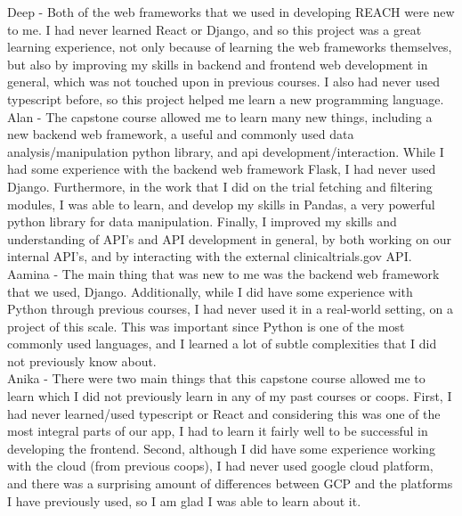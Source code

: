 \documentclass{article}
\begin{document}
    Deep - Both of the web frameworks that we used in developing REACH were new to me. I had never learned React or Django, and so this project
    was a great learning experience, not only because of learning the web frameworks themselves, but also by improving my skills in 
    backend and frontend web development in general, which was not touched upon in previous courses. I also had never used typescript before, so this project helped me learn a new programming language.\\

    Alan - The capstone course allowed me to learn many new things, including a new backend web framework, a useful and commonly used data analysis/manipulation python library, and api development/interaction. While 
    I had some experience with the backend web framework Flask, I had never used Django. Furthermore, in the work that I did on the trial fetching and filtering modules, I was able to learn, and develop 
    my skills in Pandas, a very powerful python library for data manipulation. Finally, I improved my skills and understanding of API's and API development in general, by both working on our internal 
    API's, and by interacting with the external clinicaltrials.gov API.\\

    Aamina - The main thing that was new to me was the backend web framework that we used, Django. Additionally, while I did have some experience with
    Python through previous courses, I had never used it in a real-world setting, on a project of this scale. This was important since Python is one of the most 
    commonly used languages, and I learned a lot of subtle complexities that I did not previously know about. \\

    Anika - There were two main things that this capstone course allowed me to learn which I did not previously learn in any of my past courses or coops. First, 
    I had never learned/used typescript or React and considering this was one of the most integral parts of our app, I had to learn it fairly well to be successful in 
    developing the frontend. Second, although I did have some experience working with the cloud (from previous coops), I had never used google cloud platform, and there was a surprising amount 
    of differences between GCP and the platforms I have previously used, so I am glad I was able to learn about it.
\end{document}
